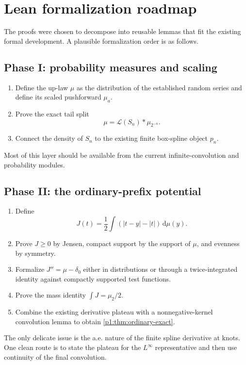 \documentclass[11pt]{article}
\numberwithin{equation}{section}
\theoremstyle{definition}
\theoremstyle{remark}
\newcommand{\dd}{\,\mathrm d}
\newcommand{\abs}[1]{\left|#1\right|}
\begin{document}
\section{Lean formalization roadmap}
\label{p1:sec:formalization}

The proofs were chosen to decompose into reusable lemmas that fit the existing formal development.  A plausible formalization order is as follows.

\subsection{Phase I: probability measures and scaling}

\begin{enumerate}
\item Define the up-law $\mu$ as the distribution of the established random series and define its scaled pushforward $\mu_a$.
\item Prove the exact tail split
\[
 \mu=\mathcal L(S_n)*\mu_{2^{-n}}.
\]
\item Connect the density of $S_n$ to the existing finite box-spline object $p_n$.
\end{enumerate}

Most of this layer should be available from the current infinite-convolution and probability modules.

\subsection{Phase II: the ordinary-prefix potential}

\begin{enumerate}
\item Define
\[
 J(t)=\frac12\int(\abs{t-y}-\abs t)\dd\mu(y).
\]
\item Prove $J\ge0$ by Jensen, compact support by the support of $\mu$, and evenness by symmetry.
\item Formalize $J''=\mu-\delta_0$ either in distributions or through a twice-integrated identity against compactly supported test functions.
\item Prove the mass identity $\int J=\mu_2/2$.
\item Combine the existing derivative plateau with a nonnegative-kernel convolution lemma to obtain \cref{p1:thm:ordinary-exact}.
\end{enumerate}

The only delicate issue is the a.e. nature of the finite spline derivative at knots.  One clean route is to state the plateau for the $L^\infty$ representative and then use continuity of the final convolution.
\end{document}
